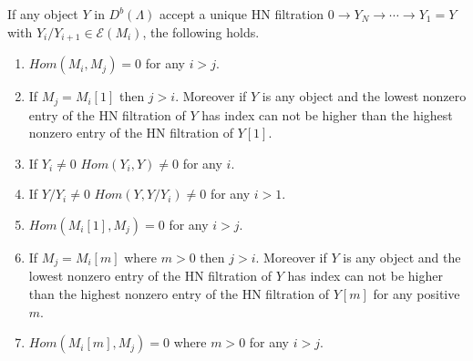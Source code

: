 \begin{lemma}\label{lem:C3L2}
If any object $Y$ in $D^b(\Lambda)$ accept a unique HN filtration $0\to Y_N\to\cdots\to Y_1=Y$ with $Y_i/Y_{i+1}\in \mathcal{E}(M_i)$, the following holds.
\begin{enumerate}
\item $Hom(M_i,M_j) = 0$ for any $i>j$.
\item If $M_j = M_i[1]$ then $j>i$. Moreover if $Y$ is any object and the lowest nonzero entry of the HN filtration of $Y$ has index can not be higher than the highest nonzero entry of the HN filtration of $Y[1]$. 
\item If $Y_i\neq 0$ $Hom(Y_i, Y)\neq 0$ for any $i$.
\item If $Y/Y_i\neq 0$ $Hom(Y, Y/Y_i)\neq 0$ for any $i>1$.
\item $Hom(M_i[1],M_j) = 0$ for any $i>j$.
\item If $M_j = M_i[m]$ where $m>0$ then $j>i$. Moreover if $Y$ is any object and the lowest nonzero entry of the HN filtration of $Y$ has index can not be higher than the highest nonzero entry of the HN filtration of $Y[m]$ for any positive $m$. 
\item $Hom(M_i[m],M_j) = 0$ where $m>0$ for any $i>j$.
\end{enumerate}
\end{lemma}
